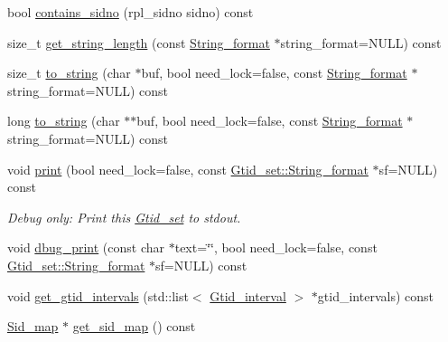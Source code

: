 \begin{DoxyCompactItemize}
bool \mbox{\hyperlink{classGtid__set_a129894d15720c07d707ca29a426cbe47}{contains\+\_\+sidno}} (rpl\+\_\+sidno sidno) const
\item 
size\+\_\+t \mbox{\hyperlink{classGtid__set_a9183195ad785890b208ce15ce111755b}{get\+\_\+string\+\_\+length}} (const \mbox{\hyperlink{structGtid__set_1_1String__format}{String\+\_\+format}} $\ast$string\+\_\+format=N\+U\+LL) const
\item 
size\+\_\+t \mbox{\hyperlink{classGtid__set_a256a8c891ab89b5388bdae4df8798d9b}{to\+\_\+string}} (char $\ast$buf, bool need\+\_\+lock=false, const \mbox{\hyperlink{structGtid__set_1_1String__format}{String\+\_\+format}} $\ast$string\+\_\+format=N\+U\+LL) const
\item 
long \mbox{\hyperlink{classGtid__set_a2ff97dca33abfc52b81adedaf416abf9}{to\+\_\+string}} (char $\ast$$\ast$buf, bool need\+\_\+lock=false, const \mbox{\hyperlink{structGtid__set_1_1String__format}{String\+\_\+format}} $\ast$string\+\_\+format=N\+U\+LL) const
\item 
\mbox{\label{classGtid__set_a79646f3e6a593f175f8b4692460bf955}} 
void \mbox{\hyperlink{classGtid__set_a79646f3e6a593f175f8b4692460bf955}{print}} (bool need\+\_\+lock=false, const \mbox{\hyperlink{structGtid__set_1_1String__format}{Gtid\+\_\+set\+::\+String\+\_\+format}} $\ast$sf=N\+U\+LL) const
\begin{DoxyCompactList}\small\item\em Debug only\+: Print this \mbox{\hyperlink{classGtid__set}{Gtid\+\_\+set}} to stdout. \end{DoxyCompactList}\item 
void \mbox{\hyperlink{classGtid__set_a9f1ff7200f92ce9911347ba459176ecd}{dbug\+\_\+print}} (const char $\ast$text=\char`\"{}\char`\"{}, bool need\+\_\+lock=false, const \mbox{\hyperlink{structGtid__set_1_1String__format}{Gtid\+\_\+set\+::\+String\+\_\+format}} $\ast$sf=N\+U\+LL) const
\item 
void \mbox{\hyperlink{classGtid__set_aa972d694a2c2f8c2b3805cf248ec7d2b}{get\+\_\+gtid\+\_\+intervals}} (std\+::list$<$ \mbox{\hyperlink{structGtid__interval}{Gtid\+\_\+interval}} $>$ $\ast$gtid\+\_\+intervals) const
\item 
\mbox{\label{classGtid__set_a1dcb30d3c0809db3baa3bce6a813332b}} 
\mbox{\hyperlink{classSid__map}{Sid\+\_\+map}} $\ast$ \mbox{\hyperlink{classGtid__set_a1dcb30d3c0809db3baa3bce6a813332b}{get\+\_\+sid\+\_\+map}} () const
$$
\end{DoxyCompactItemize}

